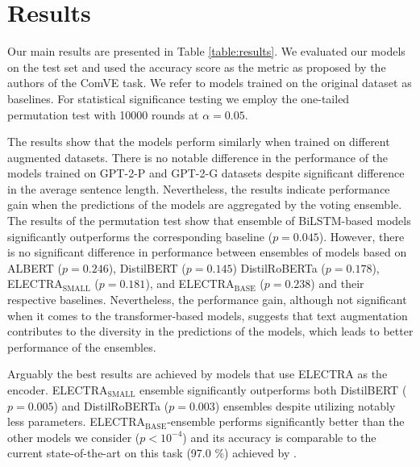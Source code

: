 \documentclass[10pt, a4paper]{article}
\begin{document}
\section{Results} %
\label{results}



Our main results are presented in Table \ref{table:results}. We evaluated our models on the test set and used the accuracy score as the metric as proposed by the authors of the ComVE task. We refer to models trained on the original dataset as baselines. For statistical significance testing we employ the one-tailed permutation test with 10000 rounds at $\alpha = 0.05$.

The results show that the models perform similarly when trained on different augmented datasets. There is no notable difference in the performance of the models trained on GPT-2-P and GPT-2-G datasets despite significant difference in the average sentence length. Nevertheless, the results indicate performance gain when the predictions of the models are aggregated by the voting ensemble. The results of the permutation test show that ensemble of BiLSTM-based models significantly outperforms the corresponding baseline ($p=0.045$). However, there is no significant difference in performance between ensembles of models based on ALBERT ($p=0.246$), DistilBERT ($p=0.145$) DistilRoBERTa ($p=0.178$), ELECTRA$_\text{SMALL}$ ($p=0.181$), and ELECTRA$_\text{BASE}$ ($p=0.238$) and their respective baselines. Nevertheless, the performance gain, although not significant when it comes to the transformer-based models, suggests that text augmentation contributes to the diversity in the predictions of the models, which leads to better performance of the ensembles. 

Arguably the best results are achieved by models that use ELECTRA as the encoder. ELECTRA$_\text{SMALL}$ ensemble significantly outperforms both DistilBERT ($p = 0.005$) and DistilRoBERTa ($p = 0.003$) ensembles despite utilizing notably less parameters. ELECTRA$_\text{BASE}$-ensemble performs significantly better than the other models we consider ($p < 10^{-4}$) and its accuracy is comparable to the current state-of-the-art on this task (97.0 \%) achieved by \citet{zhang-etal-2020-cn}. 
\end{document}
